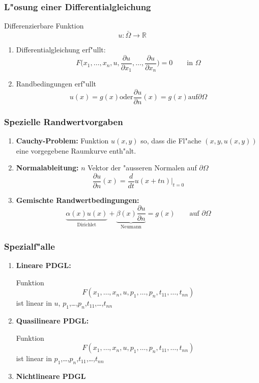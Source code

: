 \documentclass{beamer}
\begin{document}
\begin{frame}
\frametitle{L"osung einer Differentialgleichung}
Differenzierbare Funktion
\[
u\colon \bar\Omega\to\mathbb R
\]
\pause
\begin{enumerate}
\item Differentialgleichung erf"ullt:
\[
F\biggl(x_1,\dots,x_n,u,
\frac{\partial u}{\partial x_1},\dots, \frac{\partial u}{\partial x_n}
\biggr)=0\qquad\text{in $\Omega$}
\]
\pause
\item Randbedingungen erf"ullt
\[
\text{
$u(x)=g(x)$
oder
$\frac{\partial u}{\partial n}(x)=g(x)$
auf
$\partial\Omega$
}
\]
\end{enumerate}
\end{frame}

\begin{frame}
\frametitle{Spezielle Randwertvorgaben}
\begin{enumerate}
\item {\bf Cauchy-Problem:}
\pause
Funktion $u(x,y)$ so, dass die Fl"ache $(x,y,u(x,y))$ eine vorgegebene
Raumkurve enth"alt.
\medskip

\pause
\item {\bf Normalableitung:}
\pause
$n$ Vektor der "ausseren Normalen auf $\partial\Omega$
\[
\frac{\partial u}{\partial n}(x)
=
\frac{d}{dt}u(x+tn)\bigg|_{t=0}
\]
\pause
\item {\bf Gemischte Randwertbedingungen:}
\pause
\[
\underbrace{
\alpha(x) u(x)
}_{\text{Dirichlet}}
+
\underbrace{
\beta(x)\frac{\partial u}{\partial n}
}_{\text{Neumann}}
= g(x) 
\qquad
\text{auf $\partial\Omega$}
\]
\end{enumerate}
\end{frame}

\begin{frame}
\frametitle{Spezialf"alle}
\begin{enumerate}
\item {\bf Lineare PDGL:}

\pause
Funktion
\[
F(x_1,\dots,x_n,u,p_1,\dots,p_n,t_{11},\dots,t_{nn})
\]
ist linear in {\color{red}$u$}, $p_1$,\dots,$p_n$,$t_{11}$,\dots,$t_{nn}$
\pause
\item {\bf Quasilineare PDGL:}

\pause
Funktion
\[
F(x_1,\dots,x_n,u,p_1,\dots,p_n,t_{11},\dots,t_{nn})
\]
ist linear in $p_1$,\dots,$p_n$,$t_{11}$,\dots,$t_{nn}$
\pause
\item {\bf Nichtlineare PDGL}
\end{enumerate}
\end{frame}
\end{document}
